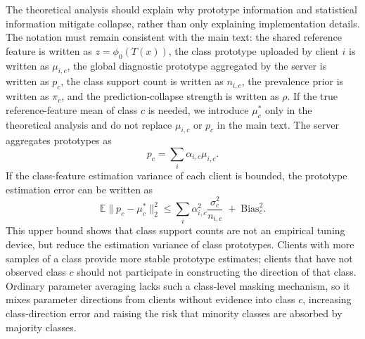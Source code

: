 \documentclass[letterpaper]{article}
\begin{document}
The theoretical analysis should explain why prototype information and statistical information mitigate collapse, rather than only explaining implementation details. The notation must remain consistent with the main text: the shared reference feature is written as $z=\phi_0(T(x))$, the class prototype uploaded by client $i$ is written as $\mu_{i,c}$, the global diagnostic prototype aggregated by the server is written as $p_c$, the class support count is written as $n_{i,c}$, the prevalence prior is written as $\pi_c$, and the prediction-collapse strength is written as $\rho$. If the true reference-feature mean of class $c$ is needed, we introduce $\mu_c^*$ only in the theoretical analysis and do not replace $\mu_{i,c}$ or $p_c$ in the main text. The server aggregates prototypes as
\begin{equation}
p_c=\sum_i \alpha_{i,c}\mu_{i,c}.
\end{equation}
If the class-feature estimation variance of each client is bounded, the prototype estimation error can be written as
\begin{equation}
\mathbb{E}\|p_c-\mu_c^*\|_2^2
\le
\sum_i \alpha_{i,c}^2\frac{\sigma_c^2}{n_{i,c}}
\;+\;\mathrm{Bias}_c^2.
\end{equation}
This upper bound shows that class support counts are not an empirical tuning device, but reduce the estimation variance of class prototypes. Clients with more samples of a class provide more stable prototype estimates; clients that have not observed class $c$ should not participate in constructing the direction of that class. Ordinary parameter averaging lacks such a class-level masking mechanism, so it mixes parameter directions from clients without evidence into class $c$, increasing class-direction error and raising the risk that minority classes are absorbed by majority classes.
\end{document}

